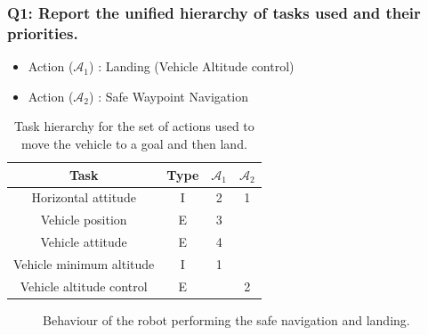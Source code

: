 \documentclass{article}
\begin{document}
\subsubsection{Q1: Report the unified hierarchy of tasks used and their priorities.}
\begin{table}[htb]
	\caption{Task hierarchy for the set of actions used to move the vehicle to a goal and then land.}
	\begin{itemize}
		\item Action ($\mathcal{A}_{1}$) : Landing (Vehicle Altitude control)
		\item Action ($\mathcal{A}_{2}$) : Safe Waypoint Navigation
	\end{itemize}
	\label{tb_align:actions_table_2_2}
	
	\begin{center}
		\footnotesize
		\begin{tabular}{cccc}
			\toprule
			Task & Type & $\mathcal{A}_{1}$ & $\mathcal{A}_{2}$\\
			\midrule
			Horizontal attitude             & I & 2 & 1 \\
			\hdashline
			Vehicle position            	& E & 3 &   \\
			\hdashline
			Vehicle attitude            	& E & 4 &   \\
			\hdashline
			Vehicle minimum altitude        & I & 1 &   \\
			\hdashline
			Vehicle altitude control        & E &   & 2 \\
			\bottomrule
		\end{tabular}
	\end{center}
\end{table}

\begin{figure}[H]
	\centering
	\hspace{10mm}
	\caption{Behaviour of the robot performing the safe navigation and landing.}
	\label{im:v_first_landing}
\end{figure} 
\end{document}
